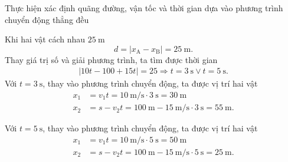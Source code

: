 \begin{dang}{Thực hiện xác định quãng đường, vận tốc và thời gian dựa vào phương trình chuyển động thẳng đều}
{	Khi hai vật cách nhau $\SI{25}{\meter}$
	\begin{equation*}
		d=\left|x_\text{A}-x_\text{B}\right|=\SI{25}{\meter}.
	\end{equation*}
	Thay giá trị số và giải phương trình, ta tìm được thời gian 
	\begin{align*}
		\left|10t-100+15t\right|=25\Rightarrow t=\SI{3}{\second} \vee t=\SI{5}{\second}.
	\end{align*}
	Với $t=\SI{3}{\second}$, thay vào phương trình chuyển động, ta được vị trí hai vật
	\begin{align*}
		x_\text{1}&=v_1t=\SI{10}{\meter/\second}\cdot\SI{3}{\second}=\SI{30}{\meter}\\
		x_\text{2}&=s-v_2t=\SI{100}{\meter}-\SI{15}{\meter/\second}\cdot\SI{3}{\second}=\SI{55}{\meter}.
	\end{align*}
	
	Với $t=\SI{5}{\second}$, thay vào phương trình chuyển động, ta được vị trí hai vật 
	\begin{align*}
		x_\text{1}&=v_1t=\SI{10}{\meter/\second}\cdot\SI{5}{\second}=\SI{50}{\meter}\\
		x_\text{2}&=s-v_2t=\SI{100}{\meter}-\SI{15}{\meter/\second}\cdot\SI{5}{\second}=\SI{25}{\meter}.
	\end{align*}
}

\end{dang}
